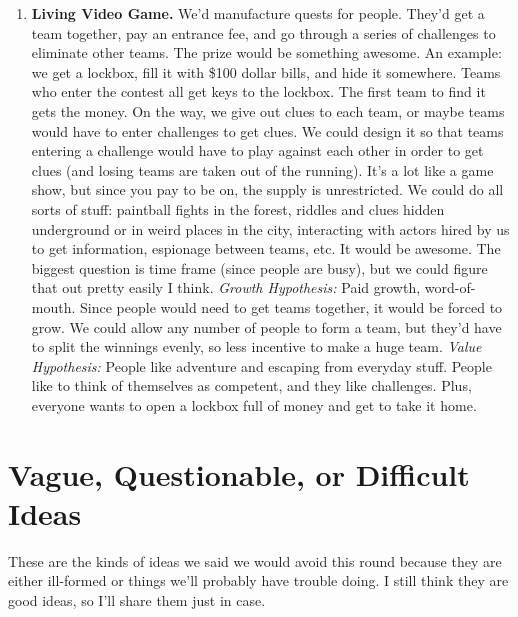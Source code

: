 \documentclass[paper=a4, fontsize=11pt]{scrartcl} %
\numberwithin{equation}{section} %
\numberwithin{figure}{section} %
\numberwithin{table}{section} %
\begin{document}
\begin{enumerate}
\item \textbf{Living Video Game.}  We'd manufacture quests for people.  They'd get a team together, pay an entrance fee, and go through a series of challenges to eliminate other teams.  The prize would be something awesome.  An example: we get a lockbox, fill it with \$100 dollar bills, and hide it somewhere.  Teams who enter the contest all get keys to the lockbox.  The first team to find it gets the money.  On the way, we give out clues to each team, or maybe teams would have to enter challenges to get clues.  We could design it so that teams entering a challenge would have to play against each other in order to get clues (and losing teams are taken out of the running).  It's a lot like a game show, but since you pay to be on, the supply is unrestricted.  We could do all sorts of stuff: paintball fights in the forest, riddles and clues hidden underground or in weird places in the city, interacting with actors hired by us to get information, espionage between teams, etc.  It would be awesome.  The biggest question is time frame (since people are busy), but we could figure that out pretty easily I think.  \textit{Growth Hypothesis:}  Paid growth, word-of-mouth.  Since people would need to get teams together, it would be forced to grow.  We could allow any number of people to form a team, but they'd have to split the winnings evenly, so less incentive to make a huge team.  \textit{Value Hypothesis:}  People like adventure and escaping from everyday stuff.  People like to think of themselves as competent, and they like challenges.  Plus, everyone wants to open a lockbox full of money and get to take it home.  

\end{enumerate}

\section{Vague, Questionable, or Difficult Ideas}

These are the kinds of ideas we said we would avoid this round because they are either ill-formed or things we'll probably have trouble doing.  I still think they are good ideas, so I'll share them just in case.
\end{document}
